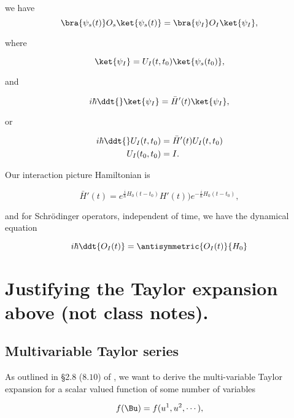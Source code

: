 we have
\begin{equation}\label{eqn:qmTwoL6:880b}
\bra{\psi_s(t)} O_s \ket{\psi_s(t)} =
\bra{\psi_I} 
O_I
\ket{\psi_I},
\end{equation}

where

\begin{equation}\label{eqn:qmTwoL6:920}
\ket{\psi_I} 
= U_I(t, t_0) \ket{\psi_s(t_0)},
\end{equation}

and

\begin{equation}\label{eqn:qmTwoL6:820b}
i \hbar \ddt{} 
\ket{\psi_I} 
= \bar{H}'(t) 
\ket{\psi_I},
\end{equation}

or

\begin{align}\label{eqn:qmTwoL6:740b}
i \hbar \ddt{} U_I(t, t_0) &= \bar{H}'(t) U_I(t, t_0) \\
U_I(t_0, t_0) &= I.
\end{align}

Our interaction picture Hamiltonian is

\begin{equation}\label{eqn:qmTwoL6:720b}
\bar{H}'(t) =
e^{\frac{i}{\hbar} H_0(t - t_0)} H'(t)) e^{-\frac{i}{\hbar} H_0(t - t_0)},
\end{equation}

and for Schr\"{o}dinger operators, independent of time, we have the dynamical equation

\begin{equation}\label{eqn:qmTwoL6:900b}
i \hbar \ddt{O_I(t)} = \antisymmetric{O_I(t)}{H_0}
\end{equation}

\section{Justifying the Taylor expansion above (not class notes).}

\subsection{Multivariable Taylor series}

As outlined in \S 2.8 ($8.10$) of \cite{hestenes1999nfc}, we want to derive the multi-variable Taylor expansion for a scalar valued function of some number of variables

\begin{equation}\label{eqn:qmTwoL6:210}
f(\Bu) = f(u^1, u^2, \cdots),
\end{equation}

